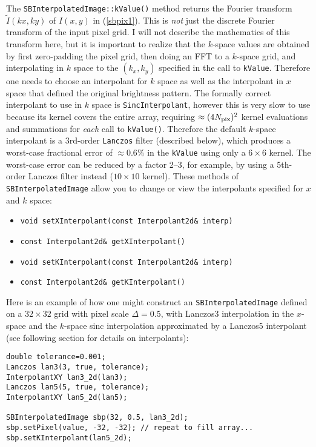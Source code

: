 \documentclass[11pt,preprint,flushrt]{aastex}
\begin{document}
The {\tt SBInterpolatedImage::kValue()} method returns the Fourier transform $\tilde I(kx,ky)$ of $I(x,y)$ in (\ref{sbpix1}). This is {\em not} just the discrete Fourier transform of the input pixel grid.  I will not describe the mathematics of this transform here, but it is important to realize that the $k$-space values are obtained by first zero-padding the pixel grid, then doing an FFT to a $k$-space grid, and interpolating in $k$ space to the $(k_x, k_y)$ specified in the call to {\tt kValue}.  Therefore one needs to choose an interpolant for $k$ space as well as the interpolant in $x$ space that defined the original brightness pattern.  The formally correct interpolant to use in $k$ space is {\tt SincInterpolant}, however this is very slow to use because its kernel covers the entire array, requiring $\approx(4N_{\rm pix})^2$ kernel evaluations and summations for {\em each} call to {\tt kValue()}.  Therefore the default $k$-space interpolant is a 3rd-order {\tt Lanczos} filter (described below), which produces a worst-case fractional error of $\approx0.6\%$ in the {\tt kValue} using only a $6\times6$ kernel.  The worst-case error can be reduced by a factor 2--3, for example, by using a 5th-order Lanczos filter instead  ($10\times10$ kernel).  These methods of {\tt SBInterpolatedImage} allow you to change or view the interpolants specified for $x$ and $k$ space:
\begin{itemize}
\item {\tt void setXInterpolant(const Interpolant2d\& interp)}
\item {\tt const Interpolant2d\&  getXInterpolant()}
\item {\tt void setKInterpolant(const Interpolant2d\& interp)}
\item {\tt const Interpolant2d\&  getKInterpolant()}
\end{itemize}
Here is an example of how one might construct an {\tt SBInterpolatedImage} defined on a $32\times32$ grid with pixel scale $\Delta=0.5$, with Lanczos3 interpolation in the $x$-space and the $k$-space sinc interpolation approximated by a Lanczos5 interpolant (see following section for details on interpolants):
\begin{verbatim}
double tolerance=0.001;
Lanczos lan3(3, true, tolerance);
InterpolantXY lan3_2d(lan3);
Lanczos lan5(5, true, tolerance);
InterpolantXY lan5_2d(lan5);

SBInterpolatedImage sbp(32, 0.5, lan3_2d);
sbp.setPixel(value, -32, -32); // repeat to fill array...
sbp.setKInterpolant(lan5_2d);
\end{verbatim}
\end{document}
